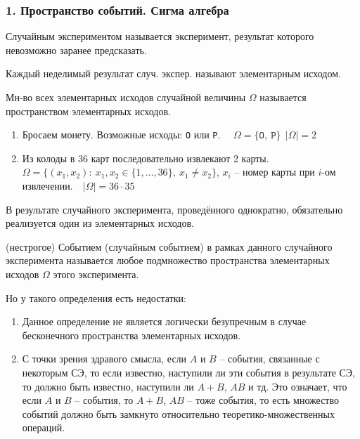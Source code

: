 
\subsubsection*{1. Пространство событий. Сигма алгебра}

\OPR Случайным экспериментом называется эксперимент, результат которого невозможно заранее предсказать.

\OPR Каждый неделимый результат случ. экспер. называют элементарным исходом.

\OPR Мн-во всех элементарных исходов случайной величины $\Omega$ называется пространством элементарных исходов.

\PRIM
\begin{enumerate}[topsep=0pt, leftmargin=18pt, noitemsep]
	\item Бросаем монету. Возможные исходы: \texttt{O} или \texttt{P}.~~ $\Omega = \{\texttt{O},~\texttt{P}\}~~|\Omega|=2$
	
	\item Из колоды в 36 карт последовательно извлекают 2 карты.~~ 
	$\Omega=\{(x_1,x_2):~x_1,x_2\in \{1,\dots,36\},~x_1\neq x_2\}$, $x_i$ -- 
	номер карты при $i$-ом извлечении.~~$|\Omega|=36\cdot 35$
\end{enumerate}

В результате случайного эксперимента, проведённого однократно, обязательно реализуется один из элементарных исходов.

\OPR (нестрогое) Событием (случайным событием) в рамках данного случайного эксперимента называется любое подмножество пространства элементарных исходов $\Omega$ этого эксперимента.

Но у такого определения есть недостатки:
\begin{enumerate}[topsep=0pt, leftmargin=18pt, noitemsep]
	\item Данное определение не является логически безупречным в случае бесконечного пространства элементарных исходов.
	\item С точки зрения здравого смысла, если $A$ и $B$ -- события, связанные с некоторым СЭ, то если известно, наступили ли эти события в результате СЭ, то должно быть известно, наступили ли $A+B$, $AB$ и тд. Это означает, что если $A$ и $B$ -- события, то $A+B$, $AB$ -- тоже события, то есть множество событий должно быть замкнуто относительно теоретико-множественных операций.
\end{enumerate}

